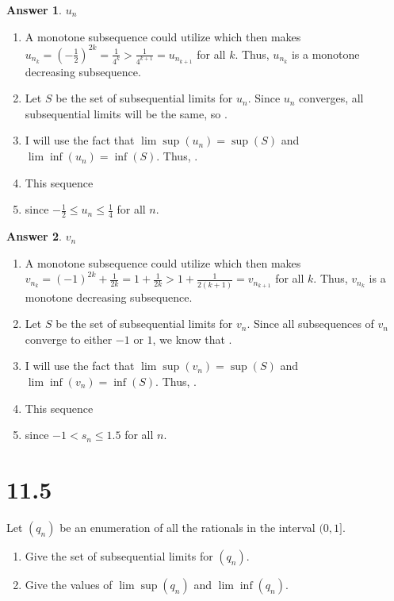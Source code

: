 \documentclass[10pt,a4paper]{article}
\theoremstyle{definition}
\newtheorem*{answer*}{Answer}
\begin{document}
\begin{answer*}{$u_n$}
\begin{enumerate}[label = (\alph*)]
\item A monotone subsequence could utilize  which then makes $u_{n_k} = (-\frac{1}{2})^{2k} = \frac{1}{4^k} > \frac{1}{4^{k+1}} = u_{n_{k+1}}$ for all $k$. Thus, $u_{n_k}$ is a monotone decreasing subsequence.
\item Let $S$ be the set of subsequential limits for $u_n$. Since $u_n$ converges, all subsequential limits will be the same, so .
\item I will use the fact that $\lim \sup(u_n) = \sup(S)$ and $\lim \inf(u_n) = \inf(S)$. Thus, .
\item This sequence 
\item {} since $-\frac{1}{2} \leq u_n \leq \frac{1}{4}$ for all $n$.
\end{enumerate}
\end{answer*}

\begin{answer*}{$v_n$}
\begin{enumerate}[label = (\alph*)]
\item A monotone subsequence could utilize  which then makes $v_{n_k} = (-1)^{2k} + \frac{1}{2k} = 1 + \frac{1}{2k} > 1 + \frac{1}{2(k+1)} = v_{n_{k+1}}$ for all $k$. Thus, $v_{n_k}$ is a monotone decreasing subsequence.
\item Let $S$ be the set of subsequential limits for $v_n$. Since all subsequences of $v_n$ converge to either $-1$ or $1$, we know that .
\item I will use the fact that $\lim \sup(v_n) = \sup(S)$ and $\lim \inf(v_n) = \inf(S)$. Thus, .
\item This sequence 
\item {} since $-1 < s_n \leq 1.5$ for all $n$.
\end{enumerate}
\end{answer*}

\section*{11.5}
Let $(q_n)$ be an enumeration of all the rationals in the interval $(0,1]$.
\begin{enumerate}[label = (\alph*)]
\item Give the set of subsequential limits for $(q_n)$.
\item Give the values of $\lim \sup(q_n)$ and $\lim \inf(q_n)$.
\end{enumerate}
\end{document}
